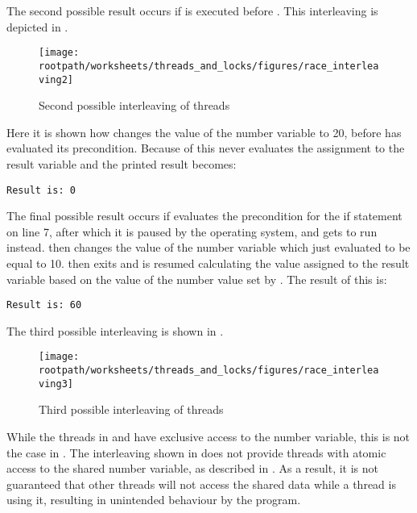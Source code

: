 The second possible result occurs if  is executed before . This interleaving is depicted in .
\begin{figure}[htbp]
\centering
 \texttt{[image: \\rootpath/worksheets/threads\_and\_locks/figures/race\_interleaving2]} 
 \caption{Second possible interleaving of threads}
\label{fig:race_interleaving2}
\end{figure}
Here it is shown how  changes the value of the number variable to 20, before  has evaluated its precondition. Because of this  never evaluates the assignment to the result variable and the printed result becomes:
\begin{verbatim}
Result is: 0
\end{verbatim}

The final possible result occurs if  evaluates the precondition for the if statement on line 7, after which it is paused by the operating system, and  gets to run instead.  then changes the value of the number variable which  just evaluated to be equal to 10.  then exits and  is resumed calculating the value assigned to the result variable based on the value of the number value set by . The result of this is:
\begin{verbatim}
Result is: 60
\end{verbatim}
The third possible interleaving is shown in . 
\begin{figure}[htbp]
\centering
 \texttt{[image: \\rootpath/worksheets/threads\_and\_locks/figures/race\_interleaving3]} 
 \caption{Third possible interleaving of threads}
\label{fig:race_interleaving3}
\end{figure}

While the threads in  and  have exclusive access to the number variable, this is not the case in . The interleaving shown in  does not provide threads with atomic access to the shared number variable, as described in . As a result, it is not guaranteed that other threads will not access the shared data while a thread is using it, resulting in unintended behaviour by the program.

